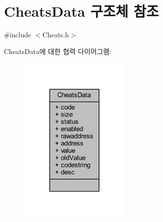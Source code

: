 \hypertarget{struct_cheats_data}{}\section{Cheats\+Data 구조체 참조}
\label{struct_cheats_data}


{\ttfamily \#include $<$Cheats.\+h$>$}



Cheats\+Data에 대한 협력 다이어그램\+:\nopagebreak
\begin{figure}[H]
\begin{center}
\leavevmode
\includegraphics[width=155pt]{struct_cheats_data__coll__graph}
\end{center}
\end{figure}
